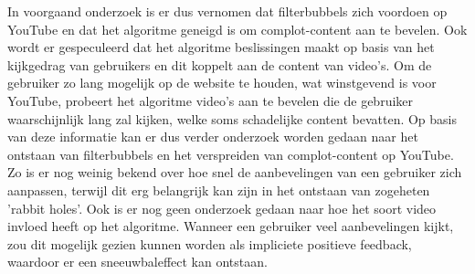 \documentclass[../main.tex]{subfiles}
\begin{document}
In voorgaand onderzoek is er dus vernomen dat filterbubbels zich voordoen op YouTube en dat het algoritme geneigd is om complot-content aan te bevelen. Ook wordt er gespeculeerd dat het algoritme beslissingen maakt op basis van het kijkgedrag van gebruikers en dit koppelt aan de content van video's. Om de gebruiker zo lang mogelijk op de website te houden, wat winstgevend is voor YouTube, probeert het algoritme video's aan te bevelen die de gebruiker waarschijnlijk lang zal kijken, welke soms schadelijke content bevatten. Op basis van deze informatie kan er dus verder onderzoek worden gedaan naar het ontstaan van filterbubbels en het verspreiden van complot-content op YouTube. Zo is er nog weinig bekend over hoe snel de aanbevelingen van een gebruiker zich aanpassen, terwijl dit erg belangrijk kan zijn in het ontstaan van zogeheten 'rabbit holes'. Ook is er nog geen onderzoek gedaan naar hoe het soort video invloed heeft op het algoritme. Wanneer een gebruiker veel aanbevelingen kijkt, zou dit mogelijk gezien kunnen worden als impliciete positieve feedback, waardoor er een sneeuwbaleffect kan ontstaan. 
\end{document}
